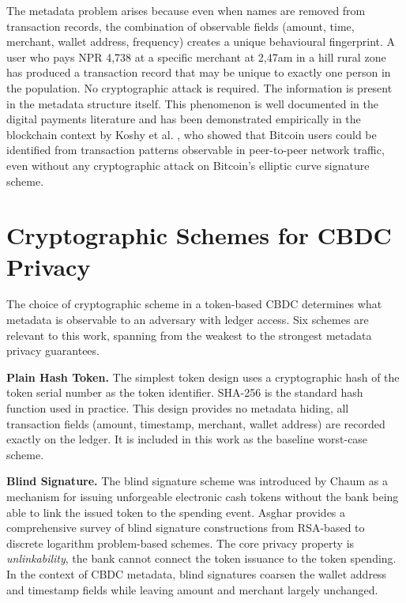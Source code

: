 The metadata problem arises because even when names are
removed from transaction records, the combination of
observable fields (amount, time, merchant, wallet
address, frequency) creates a unique behavioural
fingerprint. A user who pays NPR 4,738 at a specific
merchant at 2,47am in a hill rural zone has produced a
transaction record that may be unique to exactly one person
in the population. No cryptographic attack is required. The
information is present in the metadata structure itself.
This phenomenon is well documented in the digital payments
literature and has been demonstrated empirically in the
blockchain context by Koshy et al. \cite{koshy2014},
who showed that Bitcoin users could be identified from
transaction patterns observable in peer-to-peer network
traffic, even without any cryptographic attack on Bitcoin's
elliptic curve signature scheme.

\section{Cryptographic Schemes for CBDC Privacy}
\label{sec:crypto_schemes}

The choice of cryptographic scheme in a token-based CBDC
determines what metadata is observable to an adversary with
ledger access. Six schemes are relevant to this work,
spanning from the weakest to the strongest metadata privacy
guarantees.

\textbf{Plain Hash Token.} The simplest token design uses a
cryptographic hash of the token serial number as the token
identifier. SHA-256 is the standard hash function used in
practice. This design provides no metadata hiding, all
transaction fields (amount, timestamp, merchant, wallet
address) are recorded exactly on the ledger. It is
included in this work as the baseline worst-case scheme.

\textbf{Blind Signature.} The blind signature scheme was
introduced by Chaum \cite{chaum1983} as a mechanism
for issuing unforgeable electronic cash tokens without the
bank being able to link the issued token to the spending
event. Asghar \cite{asghar2011} provides a comprehensive
survey of blind signature constructions from RSA-based to
discrete logarithm problem-based schemes. The core privacy
property is \textit{unlinkability}, the bank cannot connect
the token issuance to the token spending. In the context of
CBDC metadata, blind signatures coarsen the wallet address
and timestamp fields while leaving amount and merchant
largely unchanged.

